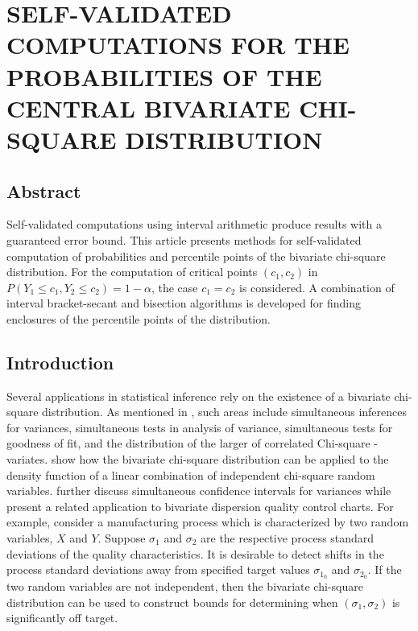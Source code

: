 

\chapter{SELF-VALIDATED COMPUTATIONS FOR THE PROBABILITIES OF THE CENTRAL
  BIVARIATE CHI-SQUARE DISTRIBUTION}

\section*{Abstract}

Self-validated computations using interval arithmetic produce results 
with a guaranteed error bound.  
This article presents methods for self-validated
computation of probabilities and percentile points of the 
bivariate chi-square
distribution.   For the computation of critical points
$(c_1, c_2)$ in $P(Y_1 \leq c_1, Y_2 \leq c_2) = 1-\alpha$, the
case $c_1 = c_2$ is considered.
A combination of interval bracket-secant and bisection
algorithms is developed for finding enclosures of the percentile 
points of the distribution.



\section{Introduction}

Several applications in statistical inference rely on the existence of 
a bivariate chi-square distribution.  As mentioned in \cite{Jensen}, such
areas include simultaneous inferences for variances, simultaneous tests in
analysis of variance, simultaneous tests for goodness of fit, and the
distribution of the larger of correlated Chi-square -variates.
\cite{Gunst} show how the bivariate chi-square distribution can be applied
to the density function of a linear combination of independent chi-square
random variables.  \cite{Jensen69} further discuss simultaneous confidence
intervals for variances while \cite{Tuprah86} present a related application to
bivariate dispersion quality control charts.  For example, consider a
manufacturing process
which is characterized by two random variables, $X$ and $Y$.  Suppose
$\sigma_1$ and $\sigma_2$ are the respective process standard deviations of
the quality characteristics. It is desirable to detect shifts in the process
standard deviations away from specified target values $\sigma_{1_0}$ and
$\sigma_{2_0}$.  If the two random variables are not independent, then the
bivariate chi-square distribution can be used to construct bounds for
determining when $(\sigma_1,\sigma_2)$ is significantly off target.

